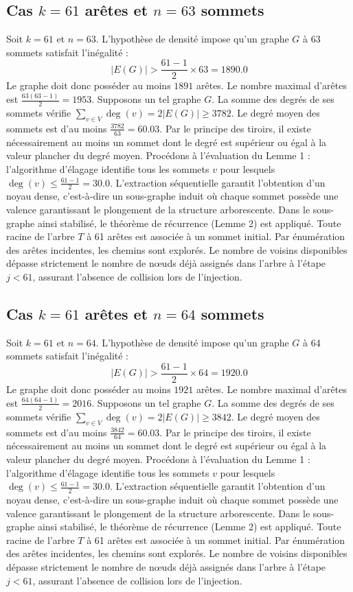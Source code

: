 \documentclass[12pt,a4paper]{article}
\begin{document}
\subsection{Cas $k = 61$ arêtes et $n = 63$ sommets}
Soit $k = 61$ et $n = 63$. L'hypothèse de densité impose qu'un graphe $G$ à 63 sommets satisfait l'inégalité :
$$ |E(G)| > \frac{61-1}{2} \times 63 = 1890.0 $$
Le graphe doit donc posséder au moins $1891$ arêtes. Le nombre maximal d'arêtes est $\frac{63(63-1)}{2} = 1953$.
Supposons un tel graphe $G$. La somme des degrés de ses sommets vérifie $\sum_{v \in V} \deg(v) = 2|E(G)| \geq 3782$.
Le degré moyen des sommets est d'au moins $\frac{3782}{63} = 60.03$.
Par le principe des tiroirs, il existe nécessairement au moins un sommet dont le degré est supérieur ou égal à la valeur plancher du degré moyen.
Procédons à l'évaluation du Lemme 1 : l'algorithme d'élagage identifie tous les sommets $v$ pour lesquels $\deg(v) \leq \frac{61-1}{2} = 30.0$.
L'extraction séquentielle garantit l'obtention d'un noyau dense, c'est-à-dire un sous-graphe induit où chaque sommet possède une valence garantissant le plongement de la structure arborescente.
Dans le sous-graphe ainsi stabilisé, le théorème de récurrence (Lemme 2) est appliqué. Toute racine de l'arbre $T$ à 61 arêtes est associée à un sommet initial. Par énumération des arêtes incidentes, les chemins sont explorés. Le nombre de voisins disponibles dépasse strictement le nombre de nœuds déjà assignés dans l'arbre à l'étape $j < 61$, assurant l'absence de collision lors de l'injection.

\subsection{Cas $k = 61$ arêtes et $n = 64$ sommets}
Soit $k = 61$ et $n = 64$. L'hypothèse de densité impose qu'un graphe $G$ à 64 sommets satisfait l'inégalité :
$$ |E(G)| > \frac{61-1}{2} \times 64 = 1920.0 $$
Le graphe doit donc posséder au moins $1921$ arêtes. Le nombre maximal d'arêtes est $\frac{64(64-1)}{2} = 2016$.
Supposons un tel graphe $G$. La somme des degrés de ses sommets vérifie $\sum_{v \in V} \deg(v) = 2|E(G)| \geq 3842$.
Le degré moyen des sommets est d'au moins $\frac{3842}{64} = 60.03$.
Par le principe des tiroirs, il existe nécessairement au moins un sommet dont le degré est supérieur ou égal à la valeur plancher du degré moyen.
Procédons à l'évaluation du Lemme 1 : l'algorithme d'élagage identifie tous les sommets $v$ pour lesquels $\deg(v) \leq \frac{61-1}{2} = 30.0$.
L'extraction séquentielle garantit l'obtention d'un noyau dense, c'est-à-dire un sous-graphe induit où chaque sommet possède une valence garantissant le plongement de la structure arborescente.
Dans le sous-graphe ainsi stabilisé, le théorème de récurrence (Lemme 2) est appliqué. Toute racine de l'arbre $T$ à 61 arêtes est associée à un sommet initial. Par énumération des arêtes incidentes, les chemins sont explorés. Le nombre de voisins disponibles dépasse strictement le nombre de nœuds déjà assignés dans l'arbre à l'étape $j < 61$, assurant l'absence de collision lors de l'injection.
\end{document}
